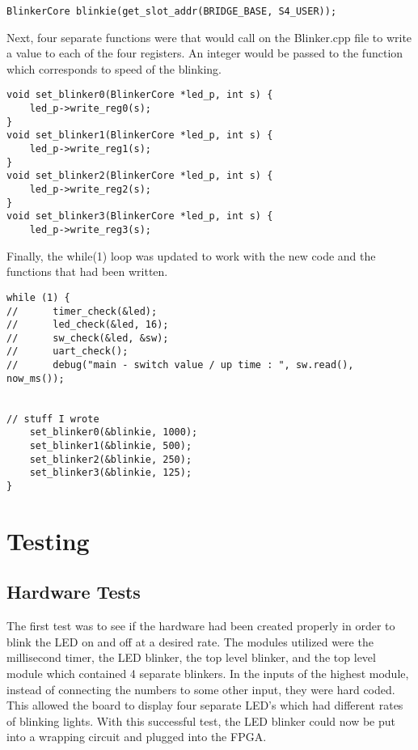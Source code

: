 \documentclass[11pt]{article}
\begin{document}
\begin{lstlisting}[style=CStyle]
BlinkerCore blinkie(get_slot_addr(BRIDGE_BASE, S4_USER));
\end{lstlisting}

\quad Next, four separate functions were that would call on the Blinker.cpp file to write a value to each of the four registers. An integer would be passed to the function which corresponds to speed of the blinking. 

\begin{lstlisting}[style=CStyle]
void set_blinker0(BlinkerCore *led_p, int s) {
	led_p->write_reg0(s);
}
void set_blinker1(BlinkerCore *led_p, int s) {
	led_p->write_reg1(s);
}
void set_blinker2(BlinkerCore *led_p, int s) {
	led_p->write_reg2(s);
}
void set_blinker3(BlinkerCore *led_p, int s) {
	led_p->write_reg3(s);
\end{lstlisting}

\quad Finally, the while(1) loop was updated to work with the new code and the functions that had been written.  

\begin{lstlisting}[style=CStyle]
while (1) {
//      timer_check(&led);
//      led_check(&led, 16);
//      sw_check(&led, &sw);
//      uart_check();
//      debug("main - switch value / up time : ", sw.read(), now_ms());


// stuff I wrote
	set_blinker0(&blinkie, 1000);
	set_blinker1(&blinkie, 500);
	set_blinker2(&blinkie, 250);
	set_blinker3(&blinkie, 125);
}
\end{lstlisting}


\section{Testing}
\subsection{Hardware Tests}
\quad The first test was to see if the hardware had been created properly in order to blink the LED on and off at a desired rate. The modules utilized were the millisecond timer, the LED blinker, the top level blinker, and the top level module which contained 4 separate blinkers. In the inputs of the highest module, instead of connecting the numbers to some other input, they were hard coded. This allowed the board to display four separate LED's which had different rates of blinking lights. With this successful test, the LED blinker could now be put into a wrapping circuit and plugged into the FPGA. 
\end{document}

